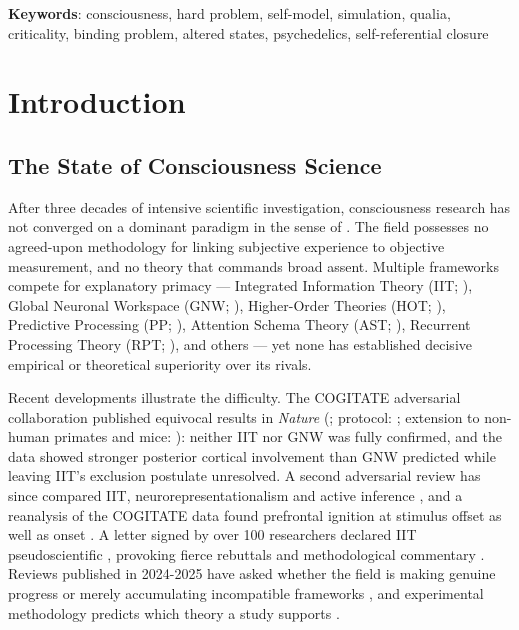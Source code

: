\documentclass[12pt]{article}
\newcommand{\rev}[1]{#1}
\begin{document}
\noindent\textbf{Keywords}: consciousness, hard problem, self-model, simulation, qualia, criticality, binding problem, altered states, psychedelics, \rev{self-referential closure}




\section{Introduction}



\subsection{The State of Consciousness Science}


After three decades of intensive scientific investigation, consciousness research has not converged on a dominant paradigm in the sense of \citet{Kuhn1962}. The field possesses no agreed-upon methodology for linking subjective experience to objective measurement, and no theory that commands broad assent. Multiple frameworks compete for explanatory primacy --- Integrated Information Theory (IIT; \citealp{Tononi2004,Albantakis2023}), Global Neuronal Workspace (GNW; \citealp{Baars1988,Dehaene2011}), Higher-Order Theories (HOT; \citealp{Rosenthal2005,Lau2011}), Predictive Processing (PP; \citealp{Friston2010,Seth2021}), Attention Schema Theory (AST; \citealp{Graziano2013}), Recurrent Processing Theory (RPT; \citealp{Lamme2006,Lamme2010}), and others --- yet none has established decisive empirical or theoretical superiority over its rivals.

Recent developments illustrate the difficulty. The COGITATE adversarial collaboration published equivocal results in \emph{Nature} (\citealp{COGITATE2025}; protocol: \citealp{Melloni2023}; extension to non-human primates and mice: \citealp{Gibbons2026}): neither IIT nor GNW was fully confirmed, and the data showed stronger posterior cortical involvement than GNW predicted while leaving IIT's exclusion postulate unresolved. A second adversarial review has since compared IIT, neurorepresentationalism and active inference \citep{Corcoran2026}, and a reanalysis of the COGITATE data found prefrontal ignition at stimulus offset as well as onset \citep{Bandara2026}. A letter signed by over 100 researchers declared IIT pseudoscientific \citep{IITConcerned2025}, provoking fierce rebuttals \citep{TononiAlbantakis2025} and methodological commentary \citep{GomezMarin2025}. Reviews published in 2024-2025 have asked whether the field is making genuine progress or merely accumulating incompatible frameworks \citep{SethBayne2022,KirkebyHinrup2025b,WagnerAltendorf2024}, and experimental methodology predicts which theory a study supports \citep{Overgaard2026}.
\end{document}
